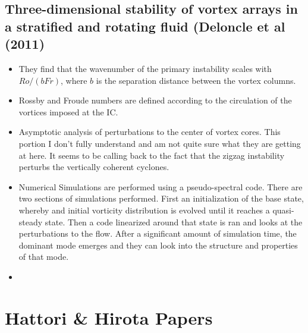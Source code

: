 \documentclass{article}
\begin{document}
    \subsection{Three-dimensional stability of vortex arrays
in a stratified and rotating fluid (Deloncle et al (2011)}
    \begin{itemize}
        \item They find that the wavenumber of the primary instability scales
        with $Ro/(bFr)$, where $b$ is the separation distance between the vortex
        columns. 
        \item Rossby and Froude numbers are defined according to the circulation
        of the vortices imposed at the IC. 
        \item Asymptotic analysis of perturbations to the center of vortex
        cores. This portion I don't fully understand and am not quite sure what
        they are getting at here. It seems to be calling back to the fact that
        the zigzag instability perturbs the vertically coherent cyclones. 
        \item Numerical Simulations are performed using a pseudo-spectral code.
        There are two sections of simulations performed. First an initialization
        of the base state, whereby and initial vorticity distribution is evolved
        until it reaches a quasi-steady state. Then a code linearized around
        that state is ran and looks at the perturbations to the flow. After a
        significant amount of simulation time, the dominant mode emerges and
        they can look into the structure and properties of that mode. 
        \item 
    \end{itemize}


\section{Hattori \& Hirota Papers}
\end{document}
